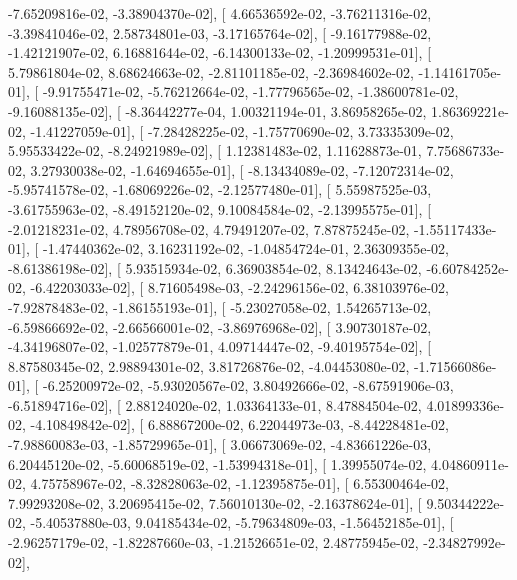 \documentclass{article}
\begin{document}
         -7.65209816e-02,  -3.38904370e-02],
       [  4.66536592e-02,  -3.76211316e-02,  -3.39841046e-02,
          2.58734801e-03,  -3.17165764e-02],
       [ -9.16177988e-02,  -1.42121907e-02,   6.16881644e-02,
         -6.14300133e-02,  -1.20999531e-01],
       [  5.79861804e-02,   8.68624663e-02,  -2.81101185e-02,
         -2.36984602e-02,  -1.14161705e-01],
       [ -9.91755471e-02,  -5.76212664e-02,  -1.77796565e-02,
         -1.38600781e-02,  -9.16088135e-02],
       [ -8.36442277e-04,   1.00321194e-01,   3.86958265e-02,
          1.86369221e-02,  -1.41227059e-01],
       [ -7.28428225e-02,  -1.75770690e-02,   3.73335309e-02,
          5.95533422e-02,  -8.24921989e-02],
       [  1.12381483e-02,   1.11628873e-01,   7.75686733e-02,
          3.27930038e-02,  -1.64694655e-01],
       [ -8.13434089e-02,  -7.12072314e-02,  -5.95741578e-02,
         -1.68069226e-02,  -2.12577480e-01],
       [  5.55987525e-03,  -3.61755963e-02,  -8.49152120e-02,
          9.10084584e-02,  -2.13995575e-01],
       [ -2.01218231e-02,   4.78956708e-02,   4.79491207e-02,
          7.87875245e-02,  -1.55117433e-01],
       [ -1.47440362e-02,   3.16231192e-02,  -1.04854724e-01,
          2.36309355e-02,  -8.61386198e-02],
       [  5.93515934e-02,   6.36903854e-02,   8.13424643e-02,
         -6.60784252e-02,  -6.42203033e-02],
       [  8.71605498e-03,  -2.24296156e-02,   6.38103976e-02,
         -7.92878483e-02,  -1.86155193e-01],
       [ -5.23027058e-02,   1.54265713e-02,  -6.59866692e-02,
         -2.66566001e-02,  -3.86976968e-02],
       [  3.90730187e-02,  -4.34196807e-02,  -1.02577879e-01,
          4.09714447e-02,  -9.40195754e-02],
       [  8.87580345e-02,   2.98894301e-02,   3.81726876e-02,
         -4.04453080e-02,  -1.71566086e-01],
       [ -6.25200972e-02,  -5.93020567e-02,   3.80492666e-02,
         -8.67591906e-03,  -6.51894716e-02],
       [  2.88124020e-02,   1.03364133e-01,   8.47884504e-02,
          4.01899336e-02,  -4.10849842e-02],
       [  6.88867200e-02,   6.22044973e-03,  -8.44228481e-02,
         -7.98860083e-03,  -1.85729965e-01],
       [  3.06673069e-02,  -4.83661226e-03,   6.20445120e-02,
         -5.60068519e-02,  -1.53994318e-01],
       [  1.39955074e-02,   4.04860911e-02,   4.75758967e-02,
         -8.32828063e-02,  -1.12395875e-01],
       [  6.55300464e-02,   7.99293208e-02,   3.20695415e-02,
          7.56010130e-02,  -2.16378624e-01],
       [  9.50344222e-02,  -5.40537880e-03,   9.04185434e-02,
         -5.79634809e-03,  -1.56452185e-01],
       [ -2.96257179e-02,  -1.82287660e-03,  -1.21526651e-02,
          2.48775945e-02,  -2.34827992e-02],
\end{document}
